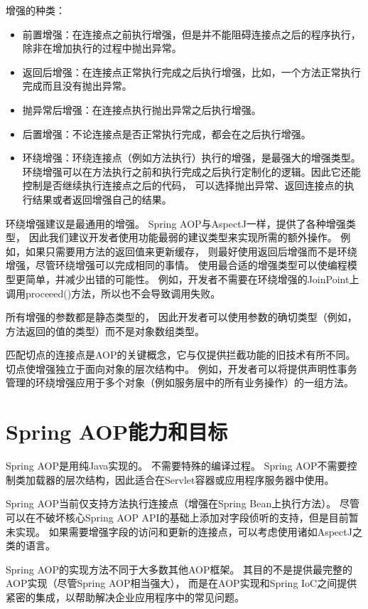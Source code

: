 增强的种类：

\begin{itemize}
    \item 前置增强：在连接点之前执行增强，但是并不能阻碍连接点之后的程序执行，除非在增加执行的过程中抛出异常。
    \item 返回后增强：在连接点正常执行完成之后执行增强，比如，一个方法正常执行完成而且没有抛出异常。
    \item 抛异常后增强：在连接点执行抛出异常之后执行增强。
    \item 后置增强：不论连接点是否正常执行完成，都会在之后执行增强。
    \item 环绕增强：环绕连接点（例如方法执行）执行的增强，是最强大的增强类型。
    环绕增强可以在方法执行之前和执行完成之后执行定制化的逻辑。因此它还能控制是否继续执行连接点之后的代码，
    可以选择抛出异常、返回连接点的执行结果或者返回增强自己的结果。
\end{itemize}

环绕增强建议是最通用的增强。
Spring AOP与AspectJ一样，提供了各种增强类型，
因此我们建议开发者使用功能最弱的建议类型来实现所需的额外操作。
例如，如果只需要用方法的返回值来更新缓存，
则最好使用返回后增强而不是环绕增强，尽管环绕增强可以完成相同的事情。
使用最合适的增强类型可以使编程模型更简单，并减少出错的可能性。
例如，开发者不需要在环绕增强的JoinPoint上调用proceeed()方法，所以也不会导致调用失败。

所有增强的参数都是静态类型的，
因此开发者可以使用参数的确切类型（例如，方法返回的值的类型）而不是对象数组类型。

匹配切点的连接点是AOP的关键概念，它与仅提供拦截功能的旧技术有所不同。
切点使增强独立于面向对象的层次结构中。
例如，开发者可以将提供声明性事务管理的环绕增强应用于多个对象（例如服务层中的所有业务操作）的一组方法。

\section{Spring AOP能力和目标}
Spring AOP是用纯Java实现的。 不需要特殊的编译过程。 
Spring AOP不需要控制类加载器的层次结构，因此适合在Servlet容器或应用程序服务器中使用。

Spring AOP当前仅支持方法执行连接点（增强在Spring Bean上执行方法）。
尽管可以在不破坏核心Spring AOP API的基础上添加对字段侦听的支持，但是目前暂未实现。
如果需要增强字段的访问和更新的连接点，可以考虑使用诸如AspectJ之类的语言。

Spring AOP的实现方法不同于大多数其他AOP框架。 
其目的不是提供最完整的AOP实现（尽管Spring AOP相当强大），
而是在AOP实现和Spring IoC之间提供紧密的集成，以帮助解决企业应用程序中的常见问题。


